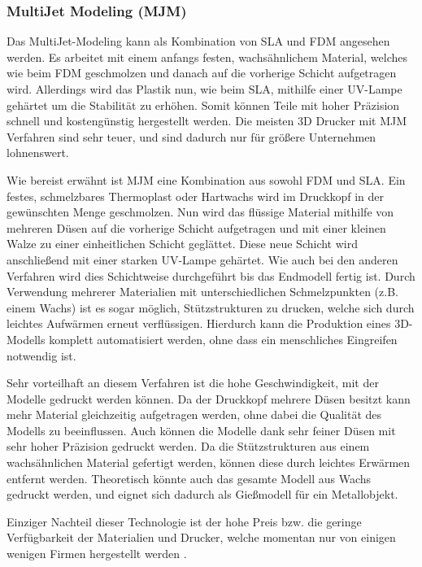 \subsubsection{MultiJet Modeling (MJM)}

Das MultiJet-Modeling kann als Kombination von SLA und FDM angesehen werden. Es arbeitet mit einem anfangs festen, wachsähnlichem Material, welches wie beim FDM geschmolzen und danach auf die vorherige Schicht aufgetragen wird. Allerdings wird das Plastik nun, wie beim SLA, mithilfe einer UV-Lampe gehärtet um die Stabilität zu erhöhen. Somit können Teile mit hoher Präzision schnell und kostengünstig hergestellt werden. Die meisten 3D Drucker mit MJM Verfahren sind sehr teuer, und sind dadurch nur für größere Unternehmen lohnenswert.

Wie bereist erwähnt ist MJM eine Kombination aus sowohl FDM und SLA. Ein festes, schmelzbares Thermoplast oder Hartwachs wird im Druckkopf in der gewünschten Menge geschmolzen. Nun wird das flüssige Material mithilfe von mehreren Düsen auf die vorherige Schicht aufgetragen und mit einer kleinen Walze zu einer einheitlichen Schicht geglättet. Diese neue Schicht wird anschließend mit einer starken UV-Lampe gehärtet. Wie auch bei den anderen Verfahren wird dies Schichtweise durchgeführt bis das Endmodell fertig ist. Durch Verwendung mehrerer Materialien mit unterschiedlichen Schmelzpunkten (z.B. einem Wachs) ist es sogar möglich, Stützstrukturen zu drucken, welche sich durch leichtes Aufwärmen erneut verflüssigen. Hierdurch kann die Produktion eines 3D-Modells komplett automatisiert werden, ohne dass ein menschliches Eingreifen notwendig ist.

Sehr vorteilhaft an diesem Verfahren ist die hohe Geschwindigkeit, mit der Modelle gedruckt werden können. Da der Druckkopf mehrere Düsen besitzt kann mehr Material gleichzeitig aufgetragen werden, ohne dabei die Qualität des Modells zu beeinflussen. Auch können die Modelle dank sehr feiner Düsen mit sehr hoher Präzision gedruckt werden. Da die Stützstrukturen aus einem wachsähnlichen Material gefertigt werden, können diese durch leichtes Erwärmen entfernt werden. Theoretisch könnte auch das gesamte Modell aus Wachs gedruckt werden, und eignet sich dadurch als Gießmodell für ein Metallobjekt.

Einziger Nachteil dieser Technologie ist der hohe Preis bzw. die geringe Verfügbarkeit der Materialien und Drucker, welche momentan nur von einigen wenigen Firmen hergestellt werden \parencite[Informationen aus:][]{DRUCKVERFAHREN,WIKIMJM}.